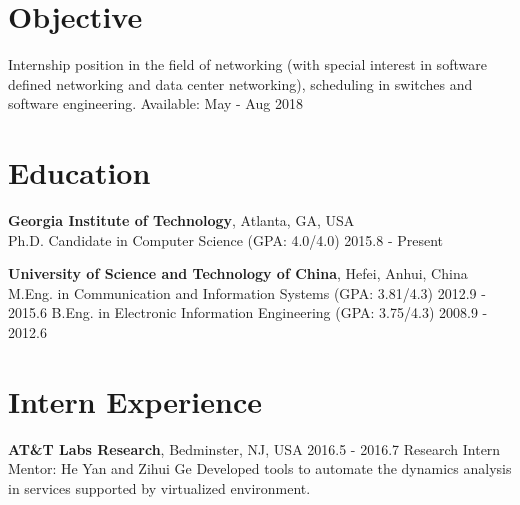 \documentclass[line,11pt,letter]{C:\Users\lgong\Dropbox\git-reps\easy_cv\includes/cls\myRes}
\begin{document}

\address{266 Ferst Dr, Atlanta, GA 30332, United States}
\address{Cell: +1(404)697-0608. \hspace{5pt} Email: gonglong@gatech.}
\begin{resume}


\vspace*{-10pt}
\vspace*{-15pt}
\section{Objective}
\vspace{-4pt}
{\setlength{\parskip}{0pt}
 {Internship position in the field of networking (with special interest in software defined networking and data center networking), scheduling in switches and software engineering. \hfill{Available: May - Aug 2018}\break}
}%
\negspace
\section{Education}
\vspace{-4pt}
{\setlength{\parskip}{0pt}
\textbf{Georgia Institute of Technology}, Atlanta, GA, USA\\
{\hspace*{1em} Ph.D. Candidate in Computer Science (GPA: 4.0/4.0) \hspace{52.5pt} \hfill 2015.8 - Present\break}
}
\sspace

{\setlength{\parskip}{0pt}
\textbf{University of Science and Technology of China}, Hefei, Anhui, China\\
{\hspace*{1em} M.Eng. in Communication and Information Systems (GPA: 3.81/4.3) \hspace{52.5pt} \hfill 2012.9 - 2015.6\break}
{\hspace*{1em} B.Eng. in Electronic Information Engineering (GPA: 3.75/4.3) \hspace{52.5pt} \hfill 2008.9 - 2012.6\break}
}
\negspace
\section{Intern Experience}
\vspace{-4pt}
{\setlength{\parskip}{0pt}
{\bf AT\&T Labs Research}, Bedminster, NJ, USA \hfill 2016.5 - 2016.7\break
{\hspace*{1em} Research Intern \hfill Mentor: He Yan and Zihui Ge\break}
{\hspace*{1em} Developed tools to automate the dynamics analysis in services supported by virtualized environment.\break}
}\negspace

\end{resume}
\end{document}
